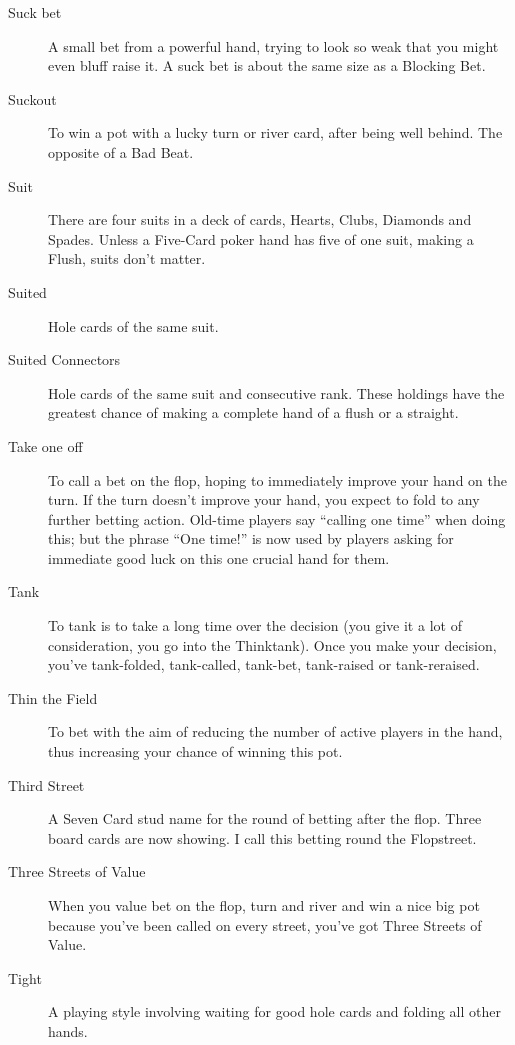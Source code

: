 \begin{description}
\item[Suck bet] A small bet from a powerful hand, trying to look so
weak that you might even bluff raise it. A suck bet is about the same
size as a Blocking Bet.

\item[Suckout] To win a pot with a lucky turn or river card, after
being well behind. The opposite of a Bad Beat.

\item[Suit] There are four suits in a deck of cards, Hearts, Clubs,
Diamonds and Spades. Unless a Five-Card poker hand has five of one
suit, making a Flush, suits don't matter.

\item[Suited] Hole cards of the same suit.

\item[Suited Connectors] Hole cards of the same suit and consecutive
rank. These holdings have the greatest chance of making a complete hand of
a flush or a straight.

\item[Take one off] To call a bet on the flop, hoping to immediately
improve your hand on the turn. If the turn doesn't improve your hand,
you expect to fold to any further betting action. Old-time players say
``calling one time'' when doing this; but the phrase ``One time!'' is now
used by players asking for immediate good luck on this one crucial
hand for them.

\item[Tank] To tank is to take a long time over the decision
(you give it a lot of consideration, you go into the Thinktank).
Once you make your decision, you've tank-folded, tank-called, tank-bet,
tank-raised or tank-reraised.

\item[Thin the Field] To bet with the aim of reducing the number of
active players in the hand, thus increasing your chance of winning
this pot.

\item[Third Street] A Seven Card stud name for the round of betting
after the flop. Three board cards are now showing. I call this betting
round the Flopstreet.

\item[Three Streets of Value] When you value bet on the flop, turn
and river and win a nice big pot because you've been called on every
street, you've got Three Streets of Value.

\item[Tight] A playing style involving waiting for good hole cards and
folding all other hands.


\end{description}
